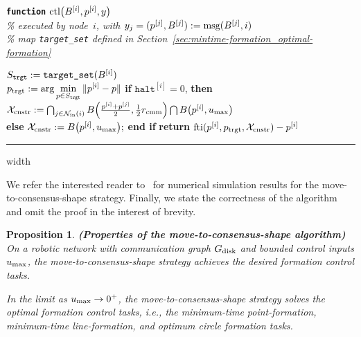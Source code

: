 \documentclass[onecolumn,journal,letterpaper]{IEEEtran}
\newcommand{\subscr}[2]{{#1}_{\textup{#2}}}
\newcommand{\norm}[1]{\|#1\|}
\newcommand{\umax}{\subscr{r}{ctr}}
\renewcommand{\umax}{\subscr{u}{max}}
\newcommand{\rcmm}{\subscr{r}{cmm}}
\newcommand{\Bigcball}[2]{B\Big(#2,#1\Big)}
\newcommand{\bigcball}[2]{B\big(#2,#1\big)}
\newcommand{\XX}{\mathcal{X}}
\newcommand{\half}{\frac{1}{2}}
\newcommand{\innbrs}{\subscr{\mathcal{N}}{in}}
\newcommand{\fti}{\text{fti}}
\newcommand{\supind}[2]{{#1}^{[#2]}}
\newcommand{\ctrl}{\textup{ctl}}
\newcommand{\msg}{\textup{msg}}
\newtheorem{proposition}[theorem]{Proposition}
\begin{document}
\noindent\textbf{\texttt{function}}  $\ctrl\big(\supind{B}{i}, \supind{p}{i}, y\big)$ \\
\emph{\% executed by node~$i$, with $y_j=(\supind{p}{j},\supind{B}{j})
  := \msg(\supind{B}{j},i)$}\\\emph{\% map \texttt{target\_set} defined in
  Section~\ref{sec:mintime-formation_optimal-formation}}\\[-1.9em]
\begin{algorithmic}[1]
  \STATE $\subscr{S}{\texttt{trgt}} := \texttt{target\_set}(\supind{B}{i})$\\
  \STATE $\displaystyle \subscr{p}{trgt} := \arg \min_{p \in \subscr{S}{\texttt{trgt}}}
  \norm{\supind{p}{i} - p}{}$
  \STATE \textbf{if} $\supind{\texttt{halt}}{i}=0$, \textbf{then}\\
  $\subscr{\XX}{cnstr}
  := \bigcap_{j\in \innbrs(i)}
  \Bigcball{\half\rcmm}{\frac{\supind{p}{i}+\supind{p}{j}}{2}}
  \bigcap \bigcball{\umax}{\supind{p}{i}}$\\
  \textbf{else} $\subscr{\XX}{cnstr}
  := \bigcball{\umax}{\supind{p}{i}};$ \quad \textbf{end if}
  \STATE \textbf{return} $\fti(\supind{p}{i}, \subscr{p}{trgt}, \subscr{\XX}{cnstr})-\supind{p}{i}$
\end{algorithmic}

\smallskip \hrule width \linewidth \medskip

We refer the interested reader to~\cite{GN-FB:06d} for numerical simulation
results for the move-to-consensus-shape strategy.  Finally, we state the
correctness of the algorithm and omit the proof in the interest of brevity.

\begin{proposition}
  \textbf{\textup{(Properties of the move-to-consensus-shape algorithm)}}
  On a robotic network with communication graph $\subscr{G}{disk}$ and
  bounded control inputs $\umax$, the move-to-consensus-shape strategy
  achieves the desired formation control tasks.

  In the limit as $\umax\to0^+$, the move-to-consensus-shape strategy
  solves the optimal formation control tasks, i.e., the minimum-time
  point-formation, minimum-time line-formation, and optimum circle
  formation tasks.
\end{proposition}
\end{document}
